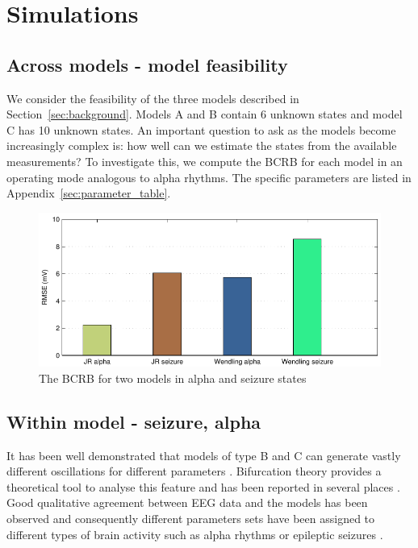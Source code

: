 \documentclass{article}
\begin{document}
\section{Simulations}

\subsection{Across models - model feasibility}

We consider the feasibility of the three models described in Section~\ref{sec:background}. Models A and B contain 6 unknown states and model C has 10 unknown states. An important question to ask as the models become increasingly complex is: how well can we estimate the states from the available measurements? To investigate this, we compute the BCRB for each model in an operating mode analogous to alpha rhythms. The specific parameters are listed in Appendix~\ref{sec:parameter_table}.

\begin{figure}[ht]
  \begin{center}
    \includegraphics{./figures/pdf/AlphaSeizureBar}
  \end{center}
  \caption{The BCRB for two models in alpha and seizure states}
  \label{fig:AlphaSeizure}
\end{figure}



\subsection{Within model - seizure, alpha}

It has been well demonstrated that models of type B and C can generate vastly different oscillations for different parameters \cite{sdf}. Bifurcation theory provides a theoretical tool to analyse this feature and has been reported in several places \cite{sdf}. Good qualitative agreement between EEG data and the models has been observed and consequently different parameters sets have been assigned to different types of brain activity such as alpha rhythms or epileptic seizures \cite{sfd}.
\end{document}
